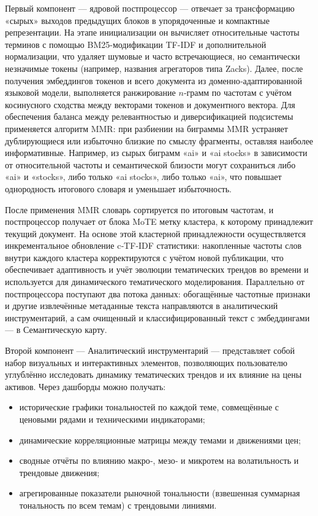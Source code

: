 Первый компонент --- ядровой постпроцессор --- отвечает за трансформацию «сырых» выходов предыдущих
блоков в упорядоченные и компактные репрезентации. На этапе инициализации он вычисляет относительные
частоты терминов с помощью BM25-модификации TF-IDF и дополнительной нормализации, что удаляет шумовые
и часто встречающиеся, но семантически незначимые токены (например, названия агрегаторов типа Zacks).
Далее, после получения эмбеддингов токенов и всего документа из доменно‑адаптированной языковой модели,
выполняется ранжирование $n$‑грамм по частотам с учётом косинусного сходства между векторами токенов
и документного вектора. Для обеспечения баланса между релевантностью и диверсификацией подсистемы
применяется алгоритм MMR: при разбиении на биграммы MMR устраняет дублирующиеся или избыточно близкие
по смыслу фрагменты, оставляя наиболее информативные. Например, из сырых биграмм «ai» и «ai stocks»
в зависимости от относительной частоты и семантической близости могут сохраниться либо «ai» и «stocks»,
либо только «ai stocks», либо только «ai», что повышает однородность итогового словаря и уменьшает
избыточность.

После применения MMR словарь сортируется по итоговым частотам, и постпроцессор получает от блока MoTE метку
кластера, к которому принадлежит текущий документ. На основе этой кластерной принадлежности осуществляется
инкрементальное обновление c‑TF‑IDF статистики: накопленные частоты слов внутри каждого кластера корректируются
с учётом новой публикации, что обеспечивает адаптивность и учёт эволюции тематических трендов во времени
и используется для динамического тематического моделирования. Параллельно от постпроцессора поступают два
потока данных: обогащённые частотные признаки и другие извлечённые метаданные текста направляются
в аналитический инструментарий, а сам очищенный и классифицированный текст с эмбеддингами --- в Семантическую карту.

Второй компонент --- Аналитический инструментарий --- представляет собой набор визуальных и интерактивных элементов,
позволяющих пользователю углублённо исследовать динамику тематических трендов и их влияние на цены активов.
Через дашборды можно получать:

\begin{itemize}
    \item исторические графики тональностей по каждой теме, совмещённые с ценовыми рядами и техническими индикаторами;
    \item динамические корреляционные матрицы между темами и движениями цен;
    \item сводные отчёты по влиянию макро‑, мезо‑ и микротем на волатильность и трендовые движения;
    \item агрегированные показатели рыночной тональности (взвешенная суммарная тональность по всем темам) с трендовыми линиями.
\end{itemize}

